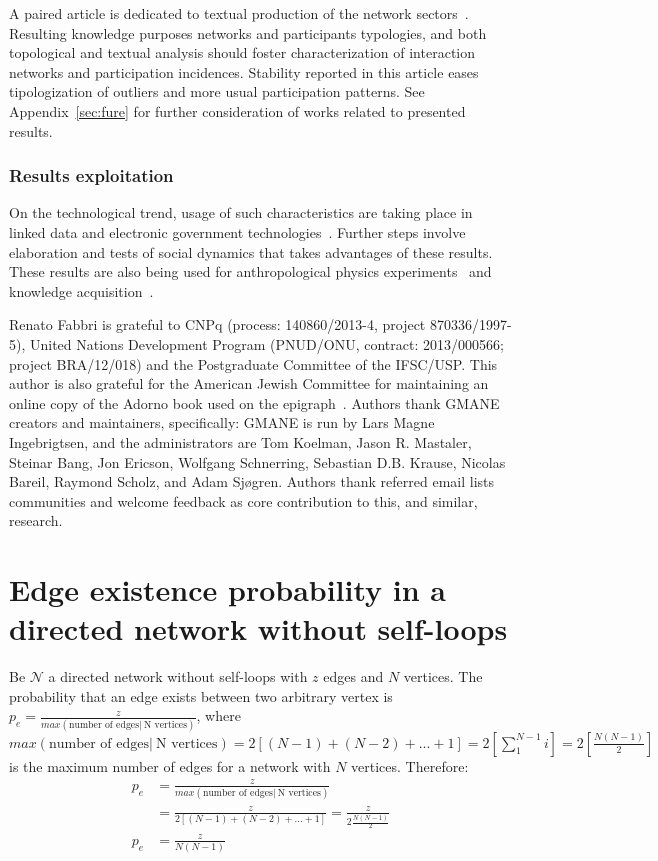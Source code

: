 \documentclass[%
 aip,
 jmp,%
 amsmath,amssymb,
 reprint,%
]{revtex4-1}
\begin{document}
A paired article  is dedicated to textual production of the network sectors~\cite{rcText}. Resulting knowledge purposes networks and participants typologies, and both topological and textual analysis should foster characterization of interaction networks and participation incidences.
Stability reported in this article eases tipologization of outliers and more usual participation patterns. See Appendix~\ref{sec:fure} for further consideration of works related to presented results.

        \subsubsection{Results exploitation}
On the technological trend, usage of such characteristics are taking place in linked data and electronic government technologies~\cite{ops,opa,ensaio}. Further steps involve elaboration and tests of social dynamics that takes advantages of these results. These results are also being used for anthropological physics experiments~\cite{anPhy} and knowledge acquisition~\cite{rcText}.

\begin{acknowledgments}
Renato Fabbri is grateful to CNPq (process: 140860/2013-4,
project 870336/1997-5), United Nations Development Program (PNUD/ONU, contract: 2013/000566; project BRA/12/018)  and 
the Postgraduate Committee of the IFSC/USP. This author is also grateful for
the American Jewish Committee for maintaining an online copy of the Adorno book
used on the epigraph~\cite{adorno}. Authors thank GMANE creators and maintainers, specifically: GMANE is run by Lars Magne Ingebrigtsen, and the administrators are Tom Koelman, Jason R. Mastaler, Steinar Bang, Jon Ericson, Wolfgang Schnerring, Sebastian D.B. Krause, Nicolas Bareil, Raymond Scholz, and Adam Sjøgren. Authors thank referred email lists communities and welcome feedback as core contribution to this, and similar, research.
\end{acknowledgments}


\appendix
\section{Edge existence probability in a directed network without self-loops}\label{ap:ded}
Be $\mathcal{N}$ a directed network without self-loops with $z$ edges and $N$ vertices. The probability that an edge exists between two arbitrary vertex is $p_e=\frac{z}{max( \text{number of edges} |\ \text{N vertices})}$, where $max( \text{number of edges} |\ \text{N vertices})=2[(N-1)+(N-2)+...+1]=2[\sum_1^{N-1}i]=2[\frac{N(N-1)}{2}]$ is the maximum number of edges for a network with $N$ vertices. Therefore:
\begin{align}
    p_e&=\frac{z}{max( \text{number of edges} |\ \text{N vertices})} \nonumber \\
       &=\frac{z}{2[(N-1)+(N-2)+...+1]}=\frac{z}{2\frac{N(N-1)}{2}} \nonumber \\
   p_e &=\frac{z}{N(N-1)}
\end{align}
\end{document}
